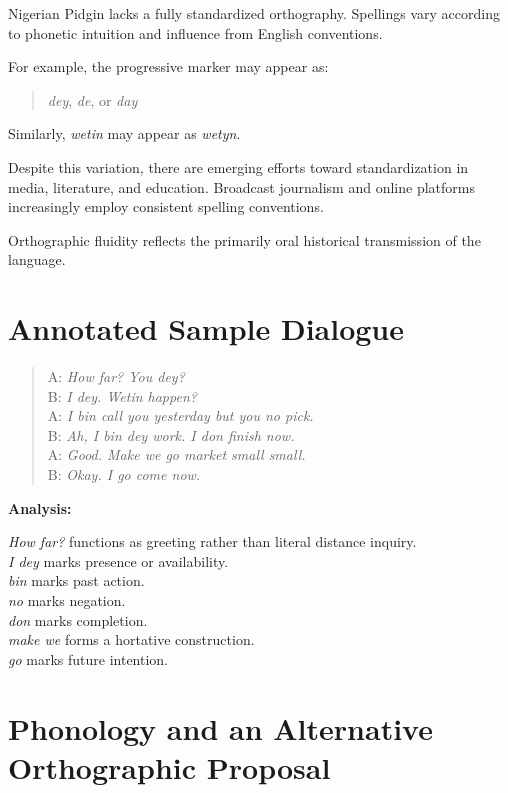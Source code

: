 \documentclass[12pt]{article}
\begin{document}
Nigerian Pidgin lacks a fully standardized orthography. Spellings vary according to phonetic intuition and influence from English conventions.

For example, the progressive marker may appear as:

\begin{quote}
\textit{dey}, \textit{de}, or \textit{day}
\end{quote}

Similarly, \textit{wetin} may appear as \textit{wetyn}.

Despite this variation, there are emerging efforts toward standardization in media, literature, and education. Broadcast journalism and online platforms increasingly employ consistent spelling conventions.

Orthographic fluidity reflects the primarily oral historical transmission of the language.

\section{Annotated Sample Dialogue}

\begin{quote}
A: \textit{How far? You dey?} \\
B: \textit{I dey. Wetin happen?} \\
A: \textit{I bin call you yesterday but you no pick.} \\
B: \textit{Ah, I bin dey work. I don finish now.} \\
A: \textit{Good. Make we go market small small.} \\
B: \textit{Okay. I go come now.}
\end{quote}

\textbf{Analysis:}

\textit{How far?} functions as greeting rather than literal distance inquiry. \\
\textit{I dey} marks presence or availability. \\
\textit{bin} marks past action. \\
\textit{no} marks negation. \\
\textit{don} marks completion. \\
\textit{make we} forms a hortative construction. \\
\textit{go} marks future intention.

\section{Phonology and an Alternative Orthographic Proposal}
\end{document}
